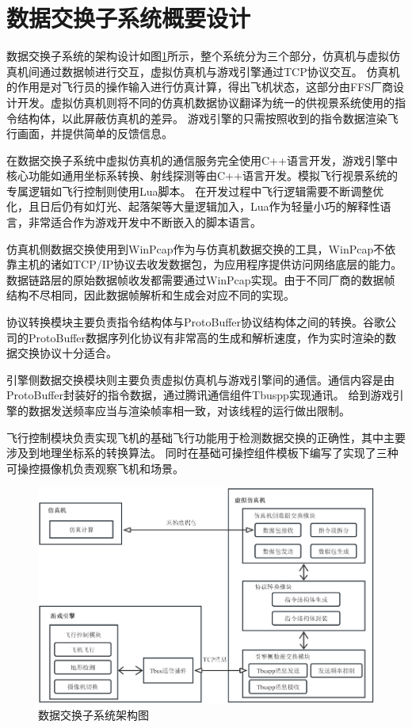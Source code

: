 \section{数据交换子系统概要设计}
数据交换子系统的架构设计如图\ref{subframe}所示，整个系统分为三个部分，仿真机与虚拟仿真机间通过数据帧进行交互，虚拟仿真机与游戏引擎通过TCP协议交互。
仿真机的作用是对飞行员的操作输入进行仿真计算，得出飞机状态，这部分由FFS厂商设计开发。虚拟仿真机则将不同的仿真机数据协议翻译为统一的供视景系统使用的指令结构体，以此屏蔽仿真机的差异。
游戏引擎的只需按照收到的指令数据渲染飞行画面，并提供简单的反馈信息。
\par 
在数据交换子系统中虚拟仿真机的通信服务完全使用C++语言开发，游戏引擎中核心功能如通用坐标系转换、射线探测等由C++语言开发。模拟飞行视景系统的专属逻辑如飞行控制则使用Lua脚本。
在开发过程中飞行逻辑需要不断调整优化，且日后仍有如灯光、起落架等大量逻辑加入，Lua作为轻量小巧的解释性语言，非常适合作为游戏开发中不断嵌入的脚本语言。
\par
仿真机侧数据交换使用到WinPcap作为与仿真机数据交换的工具，WinPcap不依靠主机的诸如TCP/IP协议去收发数据包，为应用程序提供访问网络底层的能力。
数据链路层的原始数据帧收发都需要通过WinPcap实现。由于不同厂商的数据帧结构不尽相同，因此数据帧解析和生成会对应不同的实现。
\par
协议转换模块主要负责指令结构体与ProtoBuffer协议结构体之间的转换。谷歌公司的ProtoBuffer数据序列化协议有非常高的生成和解析速度，作为实时渲染的数据交换协议十分适合。
\par
引擎侧数据交换模块则主要负责虚拟仿真机与游戏引擎间的通信。通信内容是由ProtoBuffer封装好的指令数据，通过腾讯通信组件Tbuspp实现通讯。
给到游戏引擎的数据发送频率应当与渲染帧率相一致，对该线程的运行做出限制。
\par
飞行控制模块负责实现飞机的基础飞行功能用于检测数据交换的正确性，其中主要涉及到地理坐标系的转换算法。
同时在基础可操控组件模板下编写了实现了三种可操控摄像机负责观察飞机和场景。

\begin{figure}[htbp]
    \begin{center}
        \includegraphics[width=\textwidth]{pictures/framework.pdf}
        \caption{数据交换子系统架构图}
        \label{subframe}
    \end{center}
\end{figure}
